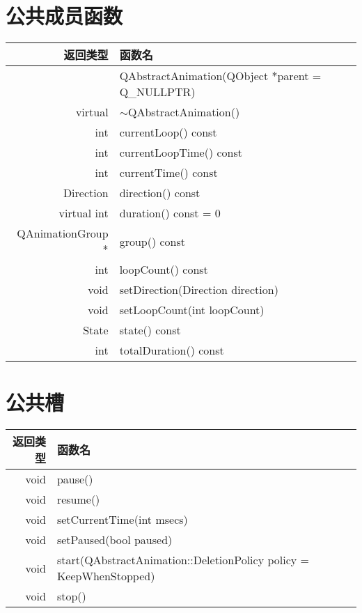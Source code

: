 \section{公共成员函数}

\begin{tabular}{|r|l|}

\hline
返回类型 &	函数名\\
\hline
& QAbstractAnimation(QObject *parent = Q\_NULLPTR)\\
\hline
virtual&$\sim$QAbstractAnimation()\\
\hline
int	& currentLoop() const\\
\hline
int	& currentLoopTime() const\\
\hline
int	& currentTime() const\\
\hline
Direction& direction() const\\
\hline
virtual int	&duration() const = 0\\
\hline
QAnimationGroup *&	group() const\\
\hline
int	&loopCount() const\\
\hline
void&	setDirection(Direction direction)\\
\hline
void&	setLoopCount(int loopCount)\\
\hline
State&	state() const\\
\hline
int	& totalDuration() const\\
\hline
\end{tabular}

\section{公共槽}

\begin{tabular}{|r|l|}
\hline
返回类型&	函数名 \\
\hline
void&	pause()\\
\hline
void&	resume()\\
\hline
void&	setCurrentTime(int msecs)\\
\hline
void&	setPaused(bool paused)\\
\hline
void&	start(QAbstractAnimation::DeletionPolicy policy = KeepWhenStopped)\\
\hline
void&	stop() \\
\hline
\end{tabular}



